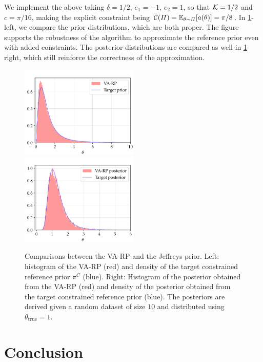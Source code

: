We implement the above taking $\delta=1/2$, $e_1=-1$, $e_2=1$, so that $\mathcal{K}=1/2$ and $c=\pi/16$, making the explicit constraint being $\mathcal{C}(\varPi) =\mathbb{E}_{\theta\sim\varPi}[a(\theta)]=\pi/8$. In  \cref{fig:VARP:normal-constr}-left, we compare the prior distributions, which are both proper. The figure %
supports the robustness of the algorithm to approximate the reference prior even with added constraints.
The posterior distributions are compared as well in \cref{fig:VARP:normal-constr}-right, which still reinforce the correctness of the approximation.


\begin{figure}[h]
    \centering
    \includegraphics[width=5.625cm]{figures/va-rp/normal_prior_constr.pdf}\hspace*{0.2cm}
    \includegraphics[width=5.625cm]{figures/va-rp/normal_post_constr.pdf}
    \caption{Comparisons between the VA-RP and the Jeffreys prior. Left: histogram of the VA-RP (red) and density of the target constrained reference prior $\pi^C$ (blue). Right: Histogram of the posterior obtained from the VA-RP (red) and density of the posterior obtained from the target constrained reference prior (blue). The posteriors are derived given a random dataset of size $10$ and distributed using $\theta_{\text{true}}=1$.}
    \label{fig:VARP:normal-constr}
\end{figure}


\section{Conclusion}\label{sec:VARP:conclusion}





